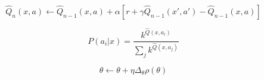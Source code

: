 \documentclass{article}
\begin{document}
\begin{equation}
    \hat{Q}_n(x, a) \leftarrow \hat{Q}_{n-1}(x, a) + \alpha \left[ r + \gamma \hat{Q}_{n-1}(x', a') - \hat{Q}_{n-1}(x, a) \right]
\end{equation}

\begin{equation}
    P(a_i | x) = \frac{k^{\hat{Q}(x, a_i)}}{\sum_j k^{\hat{Q}(x, a_j)}}
\end{equation}

\begin{equation}
    \theta \leftarrow \theta + \eta \Delta_\theta \rho(\theta)
\end{equation}
\end{document}

